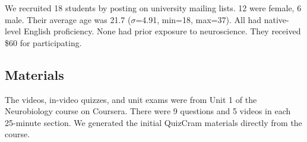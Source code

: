 \documentclass{sigchi}
\begin{document}
We recruited 18  students by posting on university mailing lists. 12 were female, 6 male. Their average age was 21.7 ($\sigma$=4.91, min=18, max=37). All had native-level English proficiency. None had prior exposure to neuroscience.  They received \$60 for participating. %

\subsection{Materials}



The videos, in-video quizzes, and unit exams were from Unit 1 of the Neurobiology course on Coursera. There were 9 questions and 5 videos in each 25-minute section. We generated the initial QuizCram materials directly from the course.


\end{document}
